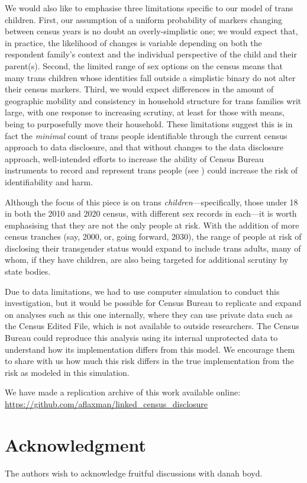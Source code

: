 \documentclass{jpc} %
\theoremstyle{plain}\newtheorem{satz}[thm]{Satz} %
\begin{document}
We would also like to emphasise three limitations specific to our model of trans children. First, our assumption of a uniform probability of markers changing between census years is no doubt an overly-simplistic one; we would expect that, in practice, the likelihood of changes is variable depending on both the respondent family's context and the individual perspective of the child and their parent(s). Second, the limited range of sex options on the census means that many trans children whose identities fall outside a simplistic binary do not alter their census markers. Third, we would expect differences in the amount of geographic mobility and consistency in household structure for trans families writ large, with one response to increasing scrutiny, at least for those with means, being to purposefully move their household. These limitations suggest this is in fact the \textit{minimal} count of trans people identifiable through the current census approach to data disclosure, and that without changes to the data disclosure approach, well-intended efforts to increase the ability of Census Bureau instruments to record and represent trans people (see \cite{whfactsheet}) could  increase the risk of identifiability and harm.

Although the focus of this piece is on trans \textit{children}---specifically, those under 18 in both the 2010 and 2020 census, with different sex records in each---it is worth emphasising that they are not the only people at risk. With the addition of more census tranches (say, 2000, or, going forward, 2030), the range of people at risk of disclosing their transgender status would expand to include trans adults, many of whom, if they have children, are also being targeted for additional scrutiny by state bodies.

Due to data limitations, we had to use computer simulation to conduct this investigation, but it would be possible for Census Bureau to replicate and expand on analyses such as this one internally, where they can use private data such as the Census Edited File, which is not available to outside researchers.  The Census Bureau could reproduce this analysis using its internal unprotected data to understand how its implementation differs from this model. We encourage them to share with us how much this risk differs in the true implementation from the risk as modeled in this simulation.

We have made a replication archive of this work available online: \url{https://github.com/aflaxman/linked_census_disclosure}
 
\section*{Acknowledgment}
  \noindent The authors wish to acknowledge fruitful discussions with danah boyd.




\end{document}
